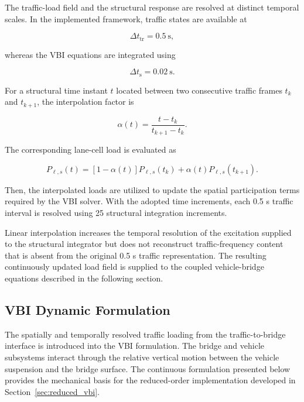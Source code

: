 \documentclass[journal]{IEEEtran}
\begin{document}
The traffic-load field and the structural response are resolved at distinct temporal scales. In the implemented framework, traffic states are available at

\begin{equation}
\Delta t_{\mathrm{tr}}
=
0.5~\mathrm{s},
\end{equation}

whereas the VBI equations are integrated using

\begin{equation}
\Delta t_{\mathrm{s}}
=
0.02~\mathrm{s}.
\end{equation}

For a structural time instant $t$ located between two consecutive traffic frames $t_k$ and $t_{k+1}$, the interpolation factor is

\begin{equation}
\alpha(t)
=
\frac{t-t_k}
{t_{k+1}-t_k}.
\end{equation}

The corresponding lane-cell load is evaluated as

\begin{equation}
P_{\ell,s}(t)
=
\left[1-\alpha(t)\right]
P_{\ell,s}(t_k)
+
\alpha(t)
P_{\ell,s}(t_{k+1}).
\end{equation}

Then, the interpolated loads are utilized to update the spatial participation terms required by the VBI solver. With the adopted time increments, each 0.5 s traffic interval is resolved using 25 structural integration increments.

Linear interpolation increases the temporal resolution of the excitation supplied to the structural integrator but does not reconstruct traffic-frequency content that is absent from the original 0.5 s traffic representation. The resulting continuously updated load field is supplied to the coupled vehicle-bridge equations described in the following section.








\subsection{VBI Dynamic Formulation}
\label{sec:vbi_dynamic_formulation}

The spatially and temporally resolved traffic loading from the traffic-to-bridge interface is introduced into the VBI formulation. The
bridge and vehicle subsystems interact through the relative vertical motion
between the vehicle suspension and the bridge surface. The continuous
formulation presented below provides the mechanical basis for the reduced-order
implementation developed in Section~\ref{sec:reduced_vbi}.
\end{document}
